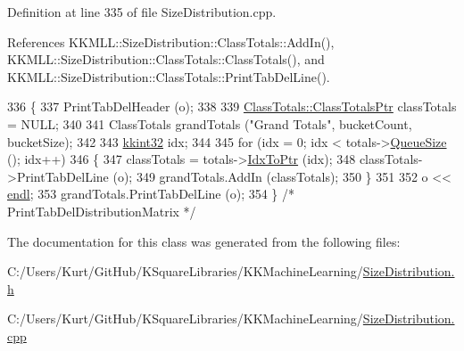 Definition at line 335 of file Size\+Distribution.\+cpp.



References K\+K\+M\+L\+L\+::\+Size\+Distribution\+::\+Class\+Totals\+::\+Add\+In(), K\+K\+M\+L\+L\+::\+Size\+Distribution\+::\+Class\+Totals\+::\+Class\+Totals(), and K\+K\+M\+L\+L\+::\+Size\+Distribution\+::\+Class\+Totals\+::\+Print\+Tab\+Del\+Line().


\begin{DoxyCode}
336 \{
337   PrintTabDelHeader (o);
338 
339   \hyperlink{class_size_distribution_1_1_class_totals_a2686de1099514e243ffe29eef7c0ed03}{ClassTotals::ClassTotalsPtr}  classTotals = NULL;
340 
341   ClassTotals  grandTotals (\textcolor{stringliteral}{"Grand Totals"}, bucketCount, bucketSize);
342 
343   \hyperlink{namespace_k_k_b_a8fa4952cc84fda1de4bec1fbdd8d5b1b}{kkint32}  idx;
344 
345   \textcolor{keywordflow}{for}  (idx = 0;  idx < totals->\hyperlink{class_k_k_b_1_1_k_k_queue_a1dab601f75ee6a65d97f02bddf71c40d}{QueueSize} (); idx++)
346   \{
347     classTotals = totals->\hyperlink{class_k_k_b_1_1_k_k_queue_acce2bdd8b3327e38266cf198382cd852}{IdxToPtr} (idx);
348     classTotals->PrintTabDelLine (o);
349     grandTotals.AddIn (classTotals);
350   \}
351 
352   o << \hyperlink{namespace_k_k_b_ad1f50f65af6adc8fa9e6f62d007818a8}{endl};
353   grandTotals.PrintTabDelLine (o);
354 \}  \textcolor{comment}{/* PrintTabDelDistributionMatrix */}
\end{DoxyCode}


The documentation for this class was generated from the following files\+:\begin{DoxyCompactItemize}
\item 
C\+:/\+Users/\+Kurt/\+Git\+Hub/\+K\+Square\+Libraries/\+K\+K\+Machine\+Learning/\hyperlink{_size_distribution_8h}{Size\+Distribution.\+h}\item 
C\+:/\+Users/\+Kurt/\+Git\+Hub/\+K\+Square\+Libraries/\+K\+K\+Machine\+Learning/\hyperlink{_size_distribution_8cpp}{Size\+Distribution.\+cpp}\end{DoxyCompactItemize}
